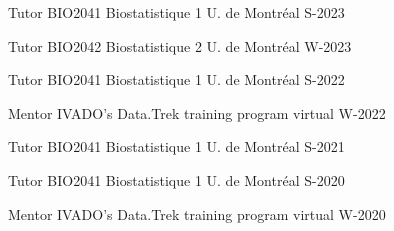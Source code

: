 
\begin{cvhonors}

  \cvhonor
    {Tutor} %
    {BIO2041 Biostatistique 1} %
    {U. de Montréal} %
    {S-2023} %

  \cvhonor
    {Tutor} %
    {BIO2042 Biostatistique 2} %
    {U. de Montréal} %
    {W-2023} %
    
  \cvhonor
    {Tutor} %
    {BIO2041 Biostatistique 1} %
    {U. de Montréal} %
    {S-2022} %

  \cvhonor
    {Mentor} %
    {IVADO's Data.Trek training program} %
    {virtual} %
    {W-2022} %
    
  \cvhonor
    {Tutor} %
    {BIO2041 Biostatistique 1} %
    {U. de Montréal} %
    {S-2021} %

  \cvhonor
    {Tutor} %
    {BIO2041 Biostatistique 1} %
    {U. de Montréal} %
    {S-2020} %

  \cvhonor
    {Mentor} %
    {IVADO's Data.Trek training program} %
    {virtual} %
    {W-2020} %
    
\end{cvhonors}



